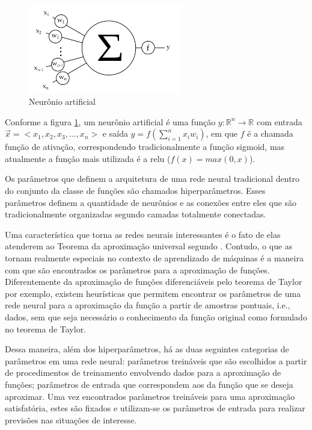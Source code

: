 \begin{figure}[!ht]
	\centering
	\includegraphics[width=0.6\textwidth]{figures/neuron.png}
	\caption{Neurônio artificial}
	\label{fig:neuron}
\end{figure}

Conforme a figura \ref{fig:neuron}, um neurônio artificial é uma função $y:\mathbb R^n \rightarrow \mathbb R$ com entrada $\vec x = <x_1,x_2,x_3,\dots,x_n>$ e saída $y = f(\sum\limits_{i=1}^n x_iw_i)$, em que $f$ é a chamada função de ativação, correspondendo tradicionalmente a função sigmoid, mas atualmente a função mais utilizada é a relu ($f(x) = max(0, x)$).

Os parâmetros que definem a arquitetura de uma rede neural tradicional dentro do conjunto da classe de funções são chamados hiperparâmetros. Esses parâmetros definem a quantidade de neurônios e as conexões entre eles que são tradicionalmente organizadas segundo camadas totalmente conectadas.

Uma característica que torna as redes neurais interessantes é o fato de elas atenderem ao Teorema da aproximação universal segundo \cite{HORNIK1991251}. Contudo, o que as tornam realmente especiais no contexto de aprendizado de máquinas é a maneira com que são encontrados os parâmetros para a aproximação de funções. Diferentemente da aproximação de funções diferenciáveis pelo teorema de Taylor por exemplo, existem heurísticas que permitem encontrar os parâmetros de uma rede neural para a aproximação da função a partir de amostras pontuais, i.e., dados, sem que seja necessário o conhecimento da função original como formulado no teorema de Taylor.

Dessa maneira, além dos hiperparâmetros, há as duas seguintes categorias de parâmetros em uma rede neural: parâmetros treináveis que são escolhidos a partir de procedimentos de treinamento envolvendo dados para a aproximação de funções; parâmetros de entrada que correspondem aos da função que se deseja aproximar. Uma vez encontrados parâmetros treináveis para uma aproximação satisfatória, estes são fixados e utilizam-se os parâmetros de entrada para realizar previsões nas situações de interesse.

